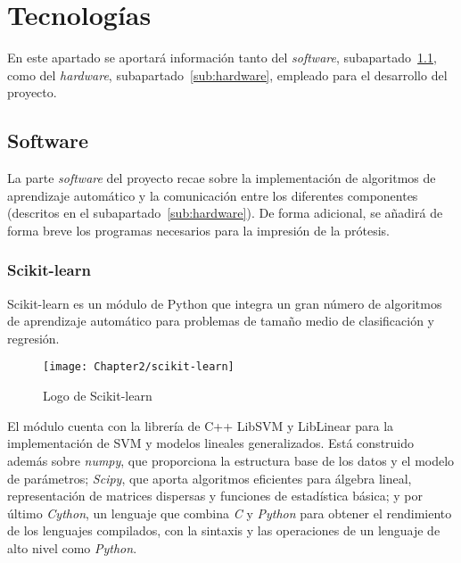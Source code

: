\section{Tecnologías}
\label{sec:tecnologías}

En este apartado se aportará información tanto del \textit{software},
subapartado~\ref{sub:software}, como del \textit{hardware}, subapartado~\ref{sub:hardware},
empleado para el desarrollo del proyecto.


\subsection{Software}
\label{sub:software}

La parte \textit{software} del proyecto recae sobre la implementación de algoritmos de
aprendizaje automático y la comunicación entre los diferentes componentes
(descritos en el subapartado~\ref{sub:hardware}). De forma adicional, se
añadirá de forma breve los programas necesarios para la impresión de la prótesis.



\subsubsection{Scikit-learn}
\label{subs:scikit-learn}


Scikit-learn \cite{scikit-learn} es un módulo de Python que integra un gran
número de algoritmos de aprendizaje automático para problemas de tamaño medio de
clasificación y regresión.

\begin{figure}[htp]
  \centering
    \texttt{[image: Chapter2/scikit-learn]}
  \caption{Logo de Scikit-learn}
\label{fig:scikit-learn}
\end{figure}

 El módulo cuenta con la librería de C++ LibSVM y
LibLinear para la implementación de SVM y modelos lineales generalizados. Está
construido además sobre \textit{numpy}, que proporciona la estructura base de
los datos y el modelo de parámetros; \textit{Scipy}, que aporta algoritmos
eficientes para álgebra lineal, representación de matrices dispersas y funciones
de estadística básica; y por último \textit{Cython}, un lenguaje que combina
\textit{C} y \textit{Python} para obtener el rendimiento de los lenguajes
compilados, con la sintaxis y las operaciones de un lenguaje de alto nivel como
\textit{Python}.

